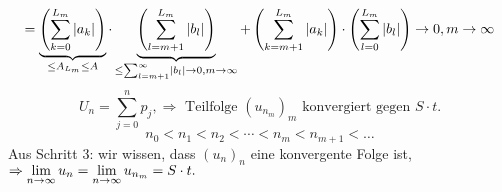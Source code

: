 \documentclass[../ana1.tex]{subfiles}
\begin{document}
\begin{bew}
    \[ = \underbrace{\left( \sum_{k=0}^{L_m} \left|a_k\right| \right)}_{\leq A_{L_m} \leq A} \cdot \underbrace{\left( \sum_{l=m+1}^{L_m} \left|b_l\right| \right)}_{\leq \sum_{l=m+1}^\infty \left|b_l\right| \rightarrow 0, m\rightarrow \infty} + \left( \sum_{k=m+1}^{L_m} \left|a_k\right| \right) \cdot \left( \sum_{l=0}^{L_m} \left|b_l\right| \right) \rightarrow 0, m\rightarrow\infty \]
    \[ U_n = \sum_{j=0}^n p_j, \Rightarrow \text{ Teilfolge } {(u_{n_m})}_m \text{ konvergiert gegen } S \cdot t. \]
    \[ n_0 < n_1 < n_2 < \cdots < n_m < n_{m+1} < \dots \]
    Aus Schritt 3: wir wissen, dass \( (u_n)_n \) eine konvergente Folge ist, \( \Rightarrow \lim\limits_{n\rightarrow\infty} u_n = \lim\limits_{n\rightarrow\infty} u_{n_m} = S \cdot t. \)
\end{bew}
\end{document}
